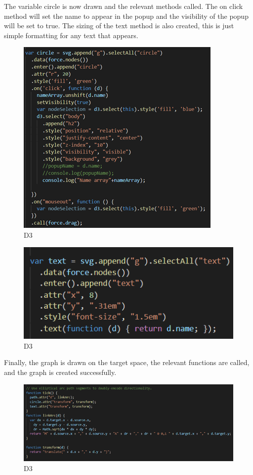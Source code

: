 The variable circle is now drawn and the relevant methods called. The on click method will set the name to appear in the popup and the visibility of the popup will be set to true. The sizing of the text method is also created, this is just simple formatting for any text that appears. \\
\begin{figure}[H]
    \centering
    \includegraphics{img/Graph5.png}
    \caption{D3} 
    \label{fig:my_label}
\end{figure}
\begin{figure}[H]
    \centering
    \includegraphics{img/Graph6.png}
    \caption{D3} 
    \label{fig:my_label}
\end{figure}
Finally, the graph is drawn on the target space, the relevant functions are called, and the graph is created successfully. \\
\begin{figure}[H]
    \centering
    \includegraphics{img/Graph7.png}
    \caption{D3} 
    \label{fig:my_label}
\end{figure}

